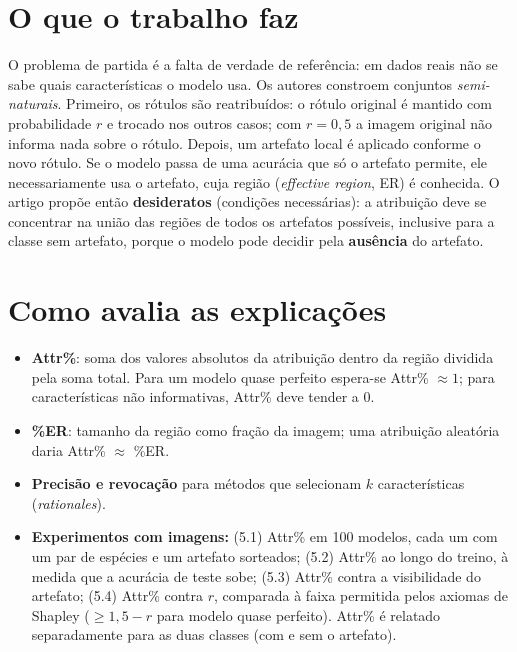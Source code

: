 \documentclass[11pt,a4paper]{article}
\begin{document}
\section{O que o trabalho faz}
O problema de partida é a falta de verdade de referência: em dados reais não se sabe quais características o modelo usa. Os autores constroem conjuntos \textit{semi-naturais}. Primeiro, os rótulos são reatribuídos: o rótulo original é mantido com probabilidade $r$ e trocado nos outros casos; com $r = 0{,}5$ a imagem original não informa nada sobre o rótulo. Depois, um artefato local é aplicado conforme o novo rótulo. Se o modelo passa de uma acurácia que só o artefato permite, ele necessariamente usa o artefato, cuja região (\textit{effective region}, ER) é conhecida. O artigo propõe então \textbf{desideratos} (condições necessárias): a atribuição deve se concentrar na união das regiões de todos os artefatos possíveis, inclusive para a classe sem artefato, porque o modelo pode decidir pela \textbf{ausência} do artefato.

\section{Como avalia as explicações}
\begin{itemize}
  \item \textbf{Attr\%}: soma dos valores absolutos da atribuição dentro da região dividida pela soma total. Para um modelo quase perfeito espera-se Attr\% $\approx 1$; para características não informativas, Attr\% deve tender a 0.
  \item \textbf{\%ER}: tamanho da região como fração da imagem; uma atribuição aleatória daria Attr\% $\approx$ \%ER.
  \item \textbf{Precisão e revocação} para métodos que selecionam $k$ características (\textit{rationales}).
  \item \textbf{Experimentos com imagens:} (5.1) Attr\% em 100 modelos, cada um com um par de espécies e um artefato sorteados; (5.2) Attr\% ao longo do treino, à medida que a acurácia de teste sobe; (5.3) Attr\% contra a visibilidade do artefato; (5.4) Attr\% contra $r$, comparada à faixa permitida pelos axiomas de Shapley ($\geq 1{,}5 - r$ para modelo quase perfeito). Attr\% é relatado separadamente para as duas classes (com e sem o artefato).
\end{itemize}
\end{document}
